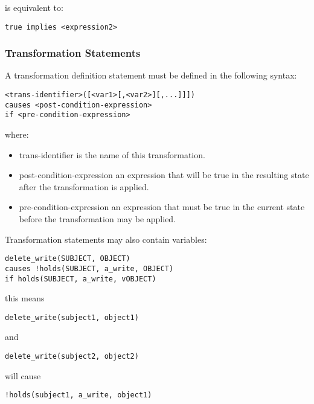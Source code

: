 \documentclass[a4paper]{article}
\begin{document}
        is equivalent to:

\begin{verbatim}
true implies <expression2>
\end{verbatim}

      \subsubsection{Transformation Statements}

        A transformation definition statement must be defined in the following
        syntax:

\begin{verbatim}
<trans-identifier>([<var1>[,<var2>][,...]]])
causes <post-condition-expression>
if <pre-condition-expression>
\end{verbatim}

        where:

        \begin{itemize}
          \item
            trans-identifier is the name of this transformation.
          \item
            post-condition-expression an expression that will be true in the
            resulting state after the transformation is applied.
          \item
            pre-condition-expression an expression that must be true in the
            current state before the transformation may be applied.
        \end{itemize}


        Transformation statements may also contain variables:

\begin{verbatim}
delete_write(SUBJECT, OBJECT)
causes !holds(SUBJECT, a_write, OBJECT)
if holds(SUBJECT, a_write, vOBJECT)
\end{verbatim}
        this means

\begin{verbatim}
delete_write(subject1, object1)
\end{verbatim}

        and

\begin{verbatim}
delete_write(subject2, object2)
\end{verbatim}

        will cause

\begin{verbatim}
!holds(subject1, a_write, object1)
\end{verbatim}
\end{document}
